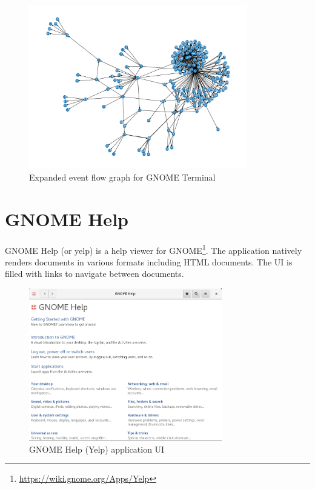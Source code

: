 \begin{figure}[H]
	\centering
	\includegraphics[width=0.85\textwidth,clip]{obrazky-figures/gnome-terminal_n_final.png}
	\caption{Expanded event flow graph for GNOME Terminal}
	\label{gnome-terminal-graph2}
\end{figure}

\section{GNOME Help}\label{}
GNOME Help (or yelp) is a help viewer for GNOME\footnote{\url{https://wiki.gnome.org/Apps/Yelp}}. The application natively renders documents in various formats including HTML documents. The UI is filled with links to navigate between documents.

\begin{figure}[H]
	\centering
	\includegraphics[width=0.75\textwidth,clip]{obrazky-figures/yelp-ui.png}
	\caption{GNOME Help (Yelp) application UI}
	\label{yelp_ui}
\end{figure}

